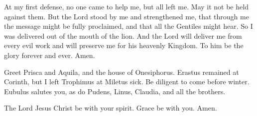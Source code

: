  At my first defense, no one came to help me, but all left
me. May it not be held against them.  But the Lord stood by
me and strengthened me, that through me the message might be fully
proclaimed, and that all the Gentiles might hear. So I was delivered out
of the mouth of the lion.  And the Lord will deliver me
from every evil work and will preserve me for his heavenly Kingdom. To
him be the glory forever and ever. Amen.

 Greet Prisca and Aquila, and the house of Onesiphorus.
 Erastus remained at Corinth, but I left Trophimus at
Miletus sick.  Be diligent to come before winter. Eubulus
salutes you, as do Pudens, Linus, Claudia, and all the brothers.

 The Lord Jesus Christ be with your spirit. Grace be with
you. Amen.
